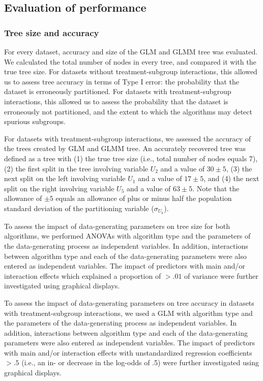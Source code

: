 \documentclass[nobf,doc]{apa}
\begin{document}
\subsection{Evaluation of performance}

\subsubsection{Tree size and accuracy} 

For every dataset, accuracy and size of the GLM and GLMM tree was evaluated. We calculated the total number of nodes in every tree, and compared it with the true tree size. For datasets without treatment-subgroup interactions, this allowed us to assess tree accuracy in terms of Type I error: the probability that the dataset is erroneously partitioned. For datasets with treatment-subgroup interactions, this allowed us to assess the probability that the dataset is erroneously not partitioned, and the extent to which the algorithms may detect spurious subgroups.

For datasets with treatment-subgroup interactions, we assessed the accuracy of the trees created by GLM and GLMM tree. An accurately recovered tree was defined as a tree with (1) the true tree size (i.e., total number of nodes equals 7), (2) the first split in the tree involving variable $U_2$ and a value of $30 \pm 5$, (3) the next split on the left involving variable $U_1$ and a value of $17 \pm 5$, and (4) the next split on the right involving variable $U_5$ and a value of $63 \pm 5$. Note that the allowance of $\pm 5$ equals an allowance of plus or minus half the population standard deviation of the partitioning variable ($\sigma_{U_k}$). 

To assess the impact of data-generating parameters on tree size for both algorithms, we performed ANOVAs with algorithm type and the parameters of the data-generating process as independent variables. In addition, interactions between algorithm type and each of the data-generating parameters were also entered as independent variables. The impact of predictors with main and/or interaction effects which explained a proportion of $> .01$ of variance were further investigated using graphical displays.

To assess the impact of data-generating parameters on tree accuracy in datasets with treatment-subgroup interactions, we used a GLM with algorithm type and the parameters of the data-generating process as independent variables. In addition, interactions between algorithm type and each of the data-generating parameters were also entered as independent variables. The impact of predictors with main and/or interaction effects with unstandardized regression coefficients $> .5$ (i.e., an in- or decrease in the log-odds of .5) were further investigated using graphical displays.
\end{document}
